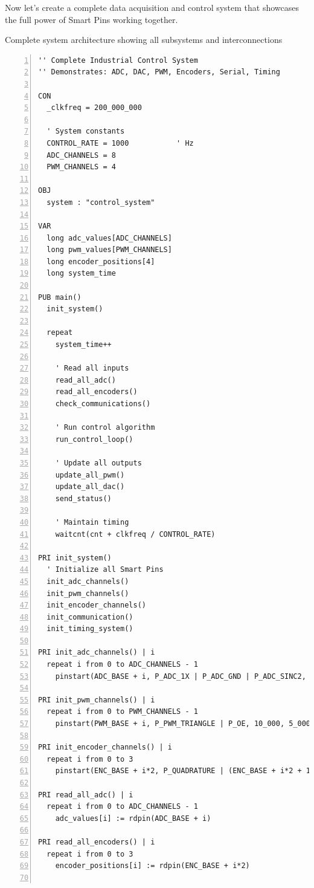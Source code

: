 \documentclass[11pt,a4paper,oneside,english]{book}
\begin{document}
Now let's create a complete data acquisition and control system that
showcases the full power of Smart Pins working together.

Complete system architecture showing all subsystems and interconnections

\begin{Spin2Block}
\begin{Verbatim}[numbers=left,numbersep=5pt,xleftmargin=15pt]
'' Complete Industrial Control System
'' Demonstrates: ADC, DAC, PWM, Encoders, Serial, Timing

CON
  _clkfreq = 200_000_000
  
  ' System constants
  CONTROL_RATE = 1000           ' Hz
  ADC_CHANNELS = 8
  PWM_CHANNELS = 4
  
OBJ
  system : "control_system"
  
VAR
  long adc_values[ADC_CHANNELS]
  long pwm_values[PWM_CHANNELS]
  long encoder_positions[4]
  long system_time
  
PUB main()
  init_system()
  
  repeat
    system_time++
    
    ' Read all inputs
    read_all_adc()
    read_all_encoders()
    check_communications()
    
    ' Run control algorithm
    run_control_loop()
    
    ' Update all outputs
    update_all_pwm()
    update_all_dac()
    send_status()
    
    ' Maintain timing
    waitcnt(cnt + clkfreq / CONTROL_RATE)

PRI init_system()
  ' Initialize all Smart Pins
  init_adc_channels()
  init_pwm_channels()
  init_encoder_channels()
  init_communication()
  init_timing_system()

PRI init_adc_channels() | i
  repeat i from 0 to ADC_CHANNELS - 1
    pinstart(ADC_BASE + i, P_ADC_1X | P_ADC_GND | P_ADC_SINC2, 0, 0)

PRI init_pwm_channels() | i
  repeat i from 0 to PWM_CHANNELS - 1
    pinstart(PWM_BASE + i, P_PWM_TRIANGLE | P_OE, 10_000, 5_000)

PRI init_encoder_channels() | i
  repeat i from 0 to 3
    pinstart(ENC_BASE + i*2, P_QUADRATURE | (ENC_BASE + i*2 + 1) << 8, 0, 0)

PRI read_all_adc() | i
  repeat i from 0 to ADC_CHANNELS - 1
    adc_values[i] := rdpin(ADC_BASE + i)

PRI read_all_encoders() | i
  repeat i from 0 to 3
    encoder_positions[i] := rdpin(ENC_BASE + i*2)


\end{Verbatim}
\end{Spin2Block}
\end{document}
